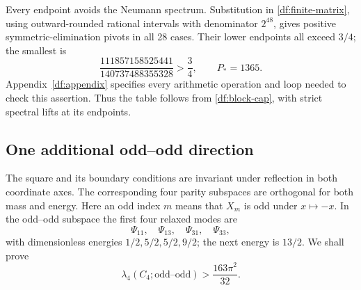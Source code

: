 \documentclass[11pt,reqno]{amsart}
\numberwithin{equation}{section}
\begin{document}
Every endpoint avoids the Neumann spectrum. Substitution in
\eqref{df:finite-matrix}, using outward-rounded rational intervals
with denominator $2^{48}$, gives positive symmetric-elimination
pivots in all 28 cases. Their lower endpoints all exceed $3/4$; the
smallest is
\begin{equation}
 \frac{111857158525441}{140737488355328}>\frac34,
 \qquad P_*=1365.
 \label{df:pivot-margin}
\end{equation}
Appendix~\ref{df:appendix} specifies every arithmetic operation and
loop needed to check this assertion. Thus the table follows from
\eqref{df:block-cap}, with strict spectral lifts at its endpoints.

\subsection{One additional odd--odd direction}

The square and its boundary conditions are invariant under reflection
in both coordinate axes. The corresponding four parity subspaces
are orthogonal for both mass and energy. Here an odd index $m$ means
that $X_m$ is odd under $x\mapsto-x$. In the odd--odd subspace the
first four relaxed modes are
\[
 \Psi_{11},\quad\Psi_{13},\quad\Psi_{31},\quad\Psi_{33},
\]
with dimensionless energies $1/2,5/2,5/2,9/2$; the next energy is
$13/2$. We shall prove
\begin{equation}
 \lambda_4(C_4;\text{odd--odd})>\frac{163\pi^2}{32}.
 \label{df:odd33-lift}
\end{equation}
\end{document}
